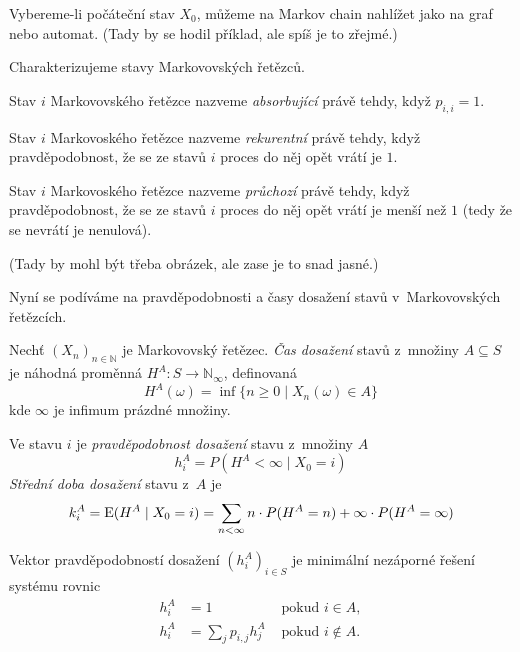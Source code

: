{Vybereme-li počáteční stav $X_0$, můžeme na Markov chain nahlížet jako na
graf nebo automat. (Tady by se hodil příklad, ale spíš je to zřejmé.)

Charakterizujeme stavy Markovovských řetězců.

\begin{definition}
    Stav $i$ Markovovského řetězce nazveme {\em absorbující}
    právě tehdy, když $p_{i,i} = 1$.
\end{definition}

\begin{definition}
    Stav $i$ Markovoského řetězce nazveme {\em rekurentní}
    právě tehdy, když pravděpodobnost, že se ze stavů $i$ proces do něj
    opět vrátí je $1$.
\end{definition}

\begin{definition}
    Stav $i$ Markovoského řetězce nazveme {\em průchozí}
    právě tehdy, když pravděpodobnost, že se ze stavů $i$ proces do něj
    opět vrátí je menší než $1$ (tedy že se nevrátí je nenulová).
\end{definition}

(Tady by mohl být třeba obrázek, ale zase je to snad jasné.)

Nyní se podíváme na pravděpodobnosti a časy dosažení stavů
v~Markovovských řetězcích.


\begin{definition}
    Nechť $(X_n)_{n \in \mathbb{N}}$ je Markovovský řetězec.
    {\em Čas dosažení} stavů z~množiny $A \subseteq S$ je
    náhodná proměnná $H^A : S \to \mathbb{N}_{\infty}$,
    definovaná
    \[
        H^A(\omega) = \inf \{ n \geq 0 \mid X_n(\omega) \in A \}
    \]
    kde $\infty$ je infimum prázdné množiny.
\end{definition}

\begin{definition}
    Ve stavu $i$ je
    {\em pravděpodobnost dosažení} stavu z~množiny $A$
    \[
        h^A_i = P(H^A < \infty \mid X_0 = i)
    \]
    {\em Střední doba dosažení} stavu z~$A$ je
    \[
        k^A_i = \operatorname{E}(H^A \mid X_0 = i)
        = \sum_{n < \infty} n \cdot P(H^A = n) + \infty \cdot P(H^A = \infty)
    \]
\end{definition}

\begin{theorem}
    Vektor pravděpodobností dosažení $(h^A_i)_{i \in S}$
    je minimální nezáporné řešení systému rovnic
    \begin{align*}
        h^A_i &= 1 &\text{ pokud } i \in A, \\
        h^A_i &= \sum_j p_{i,j} h^A_j &\text{ pokud } i \not \in A.
    \end{align*}
\end{theorem}

}

